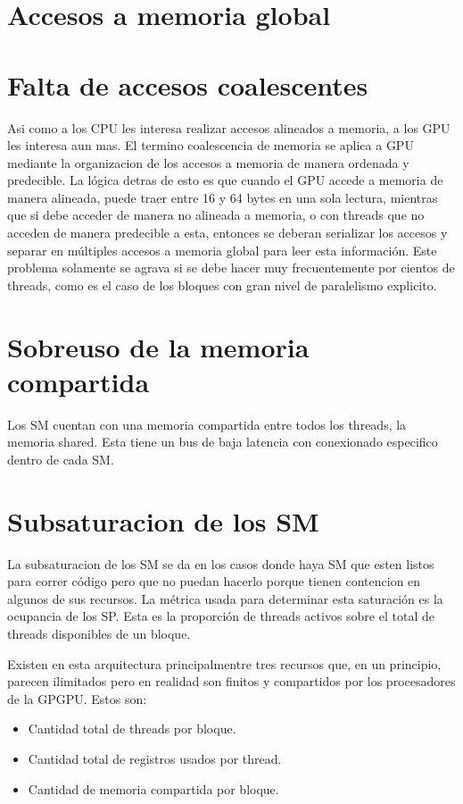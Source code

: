 \section{Accesos a memoria global}

\section{Falta de accesos coalescentes}
Asi como a los CPU les interesa realizar accesos alineados a memoria, a los GPU les
interesa aun mas. El termino coalescencia de memoria se aplica a GPU mediante
la organizacion de los accesos a memoria de manera ordenada y predecible. La l\'ogica
detras de esto es que cuando el GPU accede a memoria de manera alineada, puede traer
entre 16 y 64 bytes en una sola lectura, mientras que si debe acceder de manera no
alineada a memoria, o con threads que no acceden de manera predecible a esta, entonces
se deberan serializar los accesos y separar en m\'ultiples accesos a memoria global para leer
esta informaci\'on. Este problema solamente se agrava si se debe hacer muy frecuentemente
por cientos de threads, como es el caso de los bloques con gran nivel de paralelismo explicito.

\section{Sobreuso de la memoria compartida}

Los SM cuentan con una memoria compartida entre todos los threads, la memoria shared. Esta
tiene un bus de baja latencia con conexionado especifico dentro de cada SM.

\section{Subsaturacion de los SM}
La subsaturacion de los SM se da en los casos donde haya SM que esten listos para correr
c\'odigo pero que no puedan hacerlo porque tienen contencion en algunos de sus recursos.
La m\'etrica usada para determinar esta saturaci\'on es la ocupancia de los SP.
Esta es la proporci\'on de threads activos sobre el total de threads disponibles de un bloque.

Existen en esta arquitectura principalmentre tres recursos que, en un principio, parecen
ilimitados pero en realidad son finitos y compartidos por los procesadores de la GPGPU.
Estos son:
\begin{itemize}
\item Cantidad total de threads por bloque.
\item Cantidad total de registros usados por thread.
\item Cantidad de memoria compartida por bloque.
\end{itemize}

